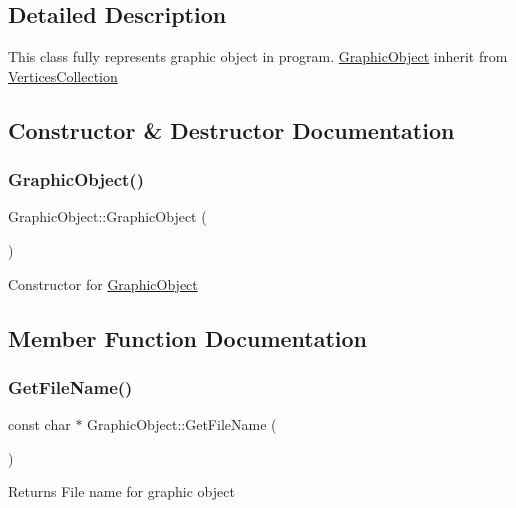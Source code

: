 \subsection{Detailed Description}
This class fully represents graphic object in program. \hyperlink{classGraphicObject}{Graphic\+Object} inherit from \hyperlink{classVerticesCollection}{Vertices\+Collection} 

\subsection{Constructor \& Destructor Documentation}
\mbox{\label{classGraphicObject_ae1b56ae4484ad120f5ba77c0b683a045}} 
\subsubsection{\texorpdfstring{Graphic\+Object()}{GraphicObject()}}
{\footnotesize\ttfamily Graphic\+Object\+::\+Graphic\+Object (\begin{DoxyParamCaption}{ }\end{DoxyParamCaption})}

Constructor for \hyperlink{classGraphicObject}{Graphic\+Object} 

\subsection{Member Function Documentation}
\mbox{\label{classGraphicObject_affe1401070f67eebcd2c6ba61ff8a275}} 
\subsubsection{\texorpdfstring{Get\+File\+Name()}{GetFileName()}}
{\footnotesize\ttfamily const char $\ast$ Graphic\+Object\+::\+Get\+File\+Name (\begin{DoxyParamCaption}{ }\end{DoxyParamCaption})}

\begin{DoxyReturn}{Returns}
File name for graphic object 
\end{DoxyReturn}
\mbox{\label{classGraphicObject_adc2f473f234cedd0a512a4e1c41e3fa4}} 
